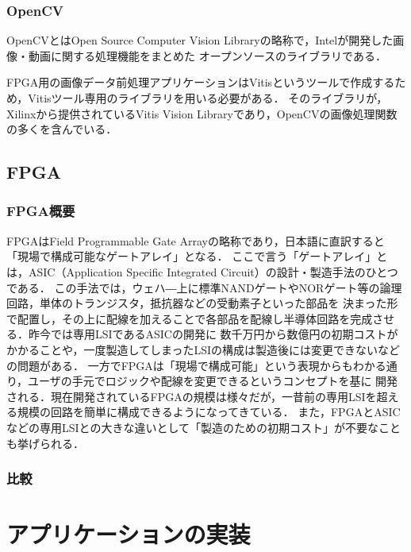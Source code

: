 \documentclass[11pt,a4j]{jreport}
\begin{document}
\subsection{OpenCV}
OpenCVとはOpen Source Computer Vision Libraryの略称で，Intelが開発した画像・動画に関する処理機能をまとめた
オープンソースのライブラリである．

FPGA用の画像データ前処理アプリケーションはVitisというツールで作成するため，Vitisツール専用のライブラリを用いる必要がある．
そのライブラリが，Xilinxから提供されているVitis Vision Libraryであり，OpenCVの画像処理関数の多くを含んでいる．

\section{FPGA}
\subsection{FPGA概要}
FPGAはField Programmable Gate Arrayの略称であり，日本語に直訳すると「現場で構成可能なゲートアレイ」となる．
ここで言う「ゲートアレイ」とは，ASIC（Application Specific Integrated Circuit）の設計・製造手法のひとつである．
この手法では，ウェハ―上に標準NANDゲートやNORゲート等の論理回路，単体のトランジスタ，抵抗器などの受動素子といった部品を
決まった形で配置し，その上に配線を加えることで各部品を配線し半導体回路を完成させる．昨今では専用LSIであるASICの開発に
数千万円から数億円の初期コストがかかることや，一度製造してしまったLSIの構成は製造後には変更できないなどの問題がある．
一方でFPGAは「現場で構成可能」という表現からもわかる通り，ユーザの手元でロジックや配線を変更できるというコンセプトを基に
開発される．現在開発されているFPGAの規模は様々だが，一昔前の専用LSIを超える規模の回路を簡単に構成できるようになってきている．
また，FPGAとASICなどの専用LSIとの大きな違いとして「製造のための初期コスト」が不要なことも挙げられる．


\subsection{比較}
%
\chapter{アプリケーションの実装}
\end{document}

